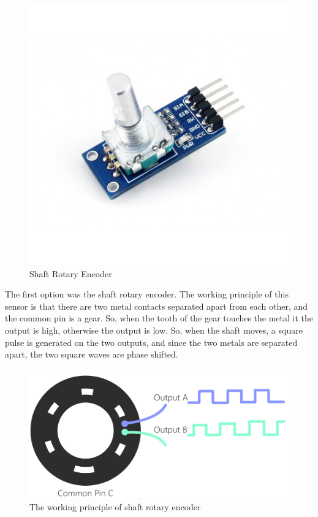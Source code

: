 \begin{figure}[h]
    \centering
    \includegraphics{figuresEncoder/2.jpeg}
    \caption{Shaft Rotary Encoder}
\end{figure}

The first option was the shaft rotary encoder. 
The working principle of this sensor is that there are two metal contacts separated apart from each other, and the common pin is a gear. So, when the tooth of the gear touches the metal it the output is high, otherwise the output is low. So, when the shaft moves, a square pulse is generated on the two outputs, and since the two metals are separated apart, the two square waves are phase shifted.

\begin{figure}[h]
    \centering
    \includegraphics[scale=.4]{figuresEncoder/3.png}
    \caption{The working principle of shaft rotary encoder}
\end{figure}


